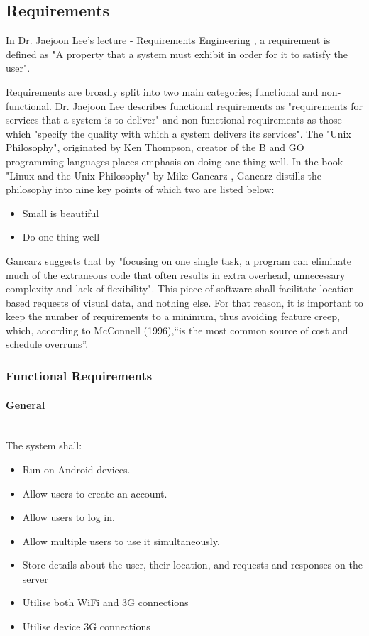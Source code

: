 \documentclass[a4paper]{article}
\newcommand{\subsubsubsection}[1]{\paragraph{#1}\mbox{}\\}
\begin{document}
\subsection{Requirements}
In Dr. Jaejoon Lee's lecture - Requirements Engineering \cite{jjoon:online}, a requirement is defined as "A property that a system must exhibit in order for it
to satisfy the user". 

Requirements are broadly split into two main categories; functional and non-functional. Dr. Jaejoon Lee describes functional requirements as 
"requirements for services that a system is to deliver" and non-functional requirements as those which "specify the quality with which a system delivers its services".
The "Unix Philosophy", originated by Ken Thompson, creator of the B and GO programming languages places emphasis on doing one thing well. In the book "Linux and the Unix Philosophy" by Mike Gancarz \cite{gancarz2003linux}, Gancarz distills the philosophy into nine key points of which two are listed below:

\begin{itemize}
\item Small is beautiful
\item Do one thing well
\end{itemize}

Gancarz suggests that by "focusing on one single task, a program can eliminate much of the extraneous code that often results in extra overhead, unnecessary complexity and lack of flexibility".
This piece of software shall facilitate location based requests of visual data, and nothing else. For that reason, it is important to keep the number of requirements to a minimum, thus avoiding feature creep, which, according to McConnell (1996),“is the most common source of cost and schedule overruns”. \cite{McConnell:1996:RDT:524972}

\subsubsection{Functional Requirements}
\subsubsubsection{General}
The system shall:
\begin{itemize}
  \item Run on Android devices.
  \item Allow users to create an account.
  \item Allow users to log in.
  \item Allow multiple users to use it simultaneously.
  \item Store details about the user, their location, and requests and  responses on the server
  \item Utilise both WiFi and 3G connections
  \item Utilise device 3G connections
\end{itemize}
\end{document}
